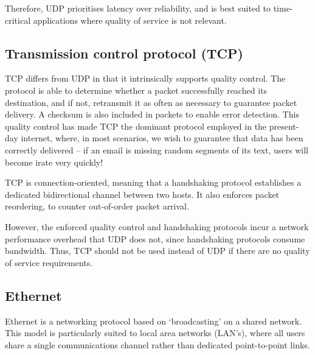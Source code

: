 \documentclass[aps,rmp,twocolumn,amsmath,amssymb,nofootinbib,superscriptaddress,longbibliography,floatfix]{revtex4-1}
\begin{document}
Therefore, UDP prioritises latency over reliability, and is best suited to time-critical applications where quality of service is not relevant.

%
%

\subsection{Transmission control protocol (TCP)} \label{sec:TCP}

TCP differs from UDP in that it intrinsically supports quality control. The protocol is able to determine whether a packet successfully reached its destination, and if not, retransmit it as often as necessary to guarantee packet delivery. A checksum is also included in packets to enable error detection. This quality control has made TCP the dominant protocol employed in the present-day internet, where, in most scenarios, we wish to guarantee that data has been correctly delivered -- if an email is missing random segments of its text, users will become irate very quickly!

TCP is connection-oriented, meaning that a handshaking protocol establishes a dedicated bidirectional channel between two hosts. It also enforces packet reordering, to counter out-of-order packet arrival.

However, the enforced quality control and handshaking protocols incur a network performance overhead that UDP does not, since handshaking protocols consume bandwidth. Thus, TCP should not be used instead of UDP if there are no quality of service requirements.

%
%

\subsection{Ethernet}

Ethernet is a networking protocol based on `broadcasting' on a shared network. This model is particularly suited to local area networks (LAN's), where all users share a single communications channel rather than dedicated point-to-point links.
\end{document}
